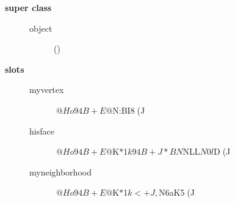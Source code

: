 {\begin{description}
\item[{\jlarge \bf super class}]\hspace{1cm}
\begin{description}
\item[object] ()
\end{description}

\item[{\jlarge \bf slots}]\hspace{1cm}
\begin{description}
\item[myvertex] $@Ho94B+E@$N:BI8(J
\item[hisface] $@Ho94B+E@$K$*$1$k94B+J*BN$NLL$N0l$D(J
\item[myneighborhood] $@Ho94B+E@$K$*$1$k<+J,$N6aK5(J
\end{description}


\end{description}}
